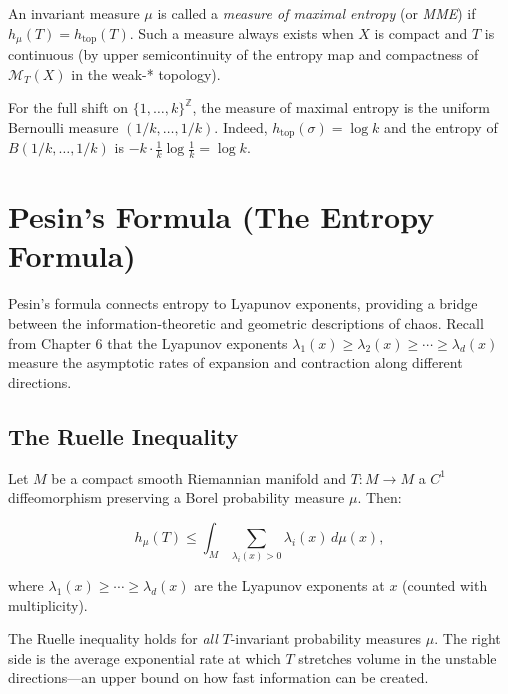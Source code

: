 \begin{definition}\label{def:11.37}
An invariant measure $\mu$ is called a \textit{measure of maximal entropy} (or \textit{MME}) if $h_\mu(T) = h_{\mathrm{top}}(T)$. Such a measure always exists when $X$ is compact and $T$ is continuous (by upper semicontinuity of the entropy map and compactness of $\mathcal{M}_T(X)$ in the weak-* topology).
\end{definition}


\begin{example}
For the full shift on $\{1, \ldots, k\}^{\mathbb{Z}}$, the measure of maximal entropy is the uniform Bernoulli measure $(1/k, \ldots, 1/k)$. Indeed, $h_{\mathrm{top}}(\sigma) = \log k$ and the entropy of $B(1/k, \ldots, 1/k)$ is $-k \cdot \frac{1}{k}\log\frac{1}{k} = \log k$.


\bigskip

\end{example}


\section{Pesin's Formula (The Entropy Formula)}\label{sec:11.9}

Pesin's formula connects entropy to Lyapunov exponents, providing a bridge between the information-theoretic and geometric descriptions of chaos. Recall from Chapter 6 that the Lyapunov exponents $\lambda_1(x) \geq \lambda_2(x) \geq \cdots \geq \lambda_d(x)$ measure the asymptotic rates of expansion and contraction along different directions.

\subsection{The Ruelle Inequality}\label{sec:11.9.1}

\begin{theorem}\label{thm:11.39}
Let $M$ be a compact smooth Riemannian manifold and $T \colon M \to M$ a $C^1$ diffeomorphism preserving a Borel probability measure $\mu$. Then:

\[
h_\mu(T) \leq \int_M \sum_{\lambda_i(x) > 0} \lambda_i(x) \, d\mu(x),
\]

where $\lambda_1(x) \geq \cdots \geq \lambda_d(x)$ are the Lyapunov exponents at $x$ (counted with multiplicity).

The Ruelle inequality holds for \textit{all} $T$-invariant probability measures $\mu$. The right side is the average exponential rate at which $T$ stretches volume in the unstable directions---an upper bound on how fast information can be created.
\end{theorem}


